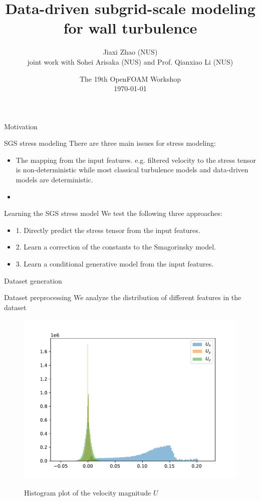 \documentclass[paper slide]{beamer}
\title[]{Data-driven subgrid-scale modeling for wall turbulence}
\author[J. Zhao]{Jiaxi Zhao (NUS) \\ \small joint work with Sohei Arisaka (NUS) and Prof. Qianxiao Li (NUS)}
\date[\today]{The 19th OpenFOAM Workshop \\ \today}
\begin{document}
\par \setlength{\parindent}{2em}

\begin{frame}
\titlepage
\end{frame}

\begin{frame}{Motivation}
	
\end{frame}

\begin{frame}{SGS stress modeling}
	There are three main issues for stress modeling:
	\begin{itemize}
		\item The mapping from the input features. e.g. filtered velocity to the stress tensor is non-deterministic while
		most classical turbulence models and data-driven models are deterministic.
		\item 
	\end{itemize}
\end{frame}

\begin{frame}{Learning the SGS stress model}
	We test the following three approaches:
	\begin{itemize}
		\item 1. Directly predict the stress tensor from the input features.
		\item 2. Learn a correction of the constants to the Smagorinsky model.
		\item 3. Learn a conditional generative model from the input features.
	\end{itemize}
\end{frame}

\begin{frame}{Dataset generation}
	
\end{frame}

\begin{frame}{Dataset preprocessing}
	We analyze the distribution of different features in the dataset
	\begin{figure}
		\includegraphics{fig/U_hist.pdf}
		\label{fig:U_hist}
		\caption{Histogram plot of the velocity magnitude $U$}
	\end{figure}
\end{frame}
\end{document}

